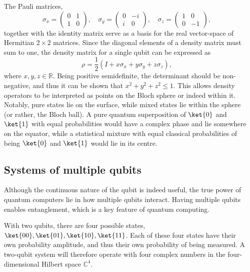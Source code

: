 The Pauli matrices,
\begin{equation}
    \sigma_x = \begin{pmatrix} 0 & 1 \\ 1 & 0 \end{pmatrix}, \quad
    \sigma_y = \begin{pmatrix} 0 & -i \\ i & 0 \end{pmatrix}, \quad
    \sigma_z = \begin{pmatrix} 1 & 0 \\ 0 & -1 \end{pmatrix},
    \label{eq:pauli}
\end{equation}
together with the identity matrix serve as a basis for the real vector-space of Hermitian $2\times 2$ matrices.
Since the diagonal elements of a density matrix must sum to one, the density matrix for a single qubit can be expressed as
\begin{equation}
    \rho = \frac{1}{2} \left(I + x \sigma_x + y \sigma_y + z \sigma_z\right),
\end{equation}
where $x, y, z \in \mathbb{R}$.
Being positive semidefinite, the determinant should be non-negative, and thus it can be shown that $x^2 + y^2 + z^2 \leq 1$.
This allows density operators to be interpreted as points on the Bloch sphere or indeed within it.
Notably, pure states lie on the surface, while mixed states lie within the sphere (or rather, the Bloch ball).
A pure quantum superposition of $\ket{0}$ and $\ket{1}$ with equal probabilities would have a complex phase and lie somewhere on the equator, while a statistical mixture with equal classical probabilities of being $\ket{0}$ and $\ket{1}$ would lie in its centre.

\subsection{Systems of multiple qubits}
Although the continuous nature of the qubit is indeed useful, the true power of quantum computers lie in how multiple qubits interact.
Having multiple qubits enables entanglement, which is a key feature of quantum computing.

With two qubits, there are four possible states, $\ket{00}, \ket{01}, \ket{10}, \ket{11}$.
Each of these four states have their own probability amplitude, and thus their own probability of being measured.
A two-qubit system will therefore operate with four complex numbers in the four-dimensional Hilbert space $\mathbb{C}^{4}$.

